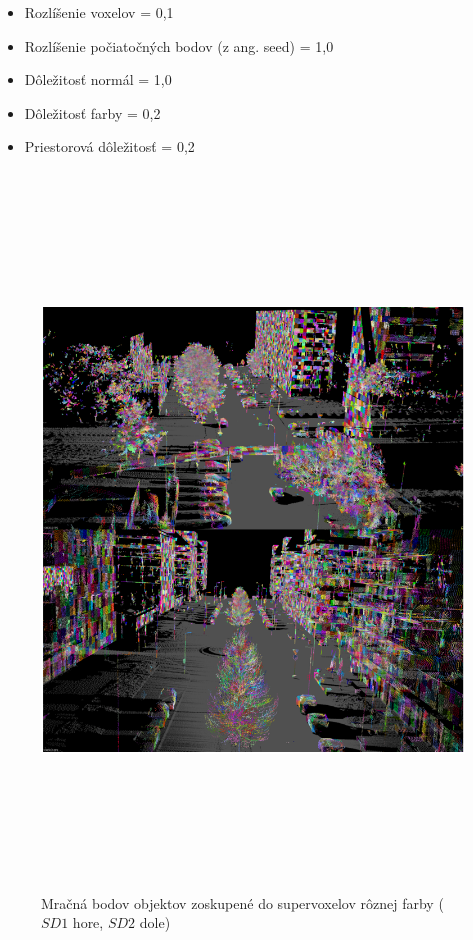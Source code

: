 \begin{itemize}
    \setlength\itemsep{0.2em}
    \item Rozlíšenie voxelov = 0,1
    \item Rozlíšenie počiatočných bodov (z ang. seed)  = 1,0
    \item Dôležitosť normál = 1,0
    \item Dôležitosť farby = 0,2
    \item Priestorová dôležitosť = 0,2
\end{itemize}

\newpage\vfill
\begin{figure}[ht]
  \centering
  \includegraphics[width=16cm, height=19cm]{img/supervoxel.png}
  \caption{Mračná bodov objektov zoskupené do supervoxelov rôznej farby ($SD1$ hore, $SD2$ dole)} 
  \label{fig:supervoxel}
\end{figure} 
\vfill\clearpage

